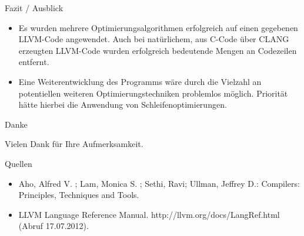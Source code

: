 \documentclass[ucs,9pt]{beamer}
\begin{document}
\begin{frame}{Fazit / Ausblick}
\begin{itemize}
\item Es wurden mehrere Optimierungsalgorithmen erfolgreich auf einen gegebenen LLVM-Code angewendet. Auch bei natürlichem, aus C-Code über CLANG erzeugten LLVM-Code wurden erfolgreich bedeutende Mengen an Codezeilen entfernt.
\vspace{3mm}
\item Eine Weiterentwicklung des Programms wäre durch die Vielzahl an potentiellen weiteren Optimierungstechniken problemlos möglich. Priorität hätte hierbei die Anwendung von Schleifenoptimierungen.
\end{itemize}
\end{frame}

\begin{frame}{Danke}
	\begin{center}
		\begin{Large}Vielen Dank für Ihre Aufmerksamkeit.\end{Large}
	\end{center}
\end{frame}


\begin{frame}{Quellen}
	\begin{itemize}
		\item Aho, Alfred V. ; Lam, Monica S. ; Sethi, Ravi; Ullman, Jeffrey D.: Compilers: Principles, Techniques and Tools.
		\vspace{2mm}
		\item LLVM Language Reference Manual. http://llvm.org/docs/LangRef.html (Abruf 17.07.2012).
	\end{itemize}
\end{frame}
\end{document}
